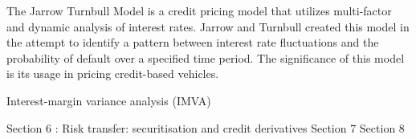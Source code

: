 The Jarrow Turnbull Model is a credit pricing model that utilizes multi-factor and dynamic analysis of interest rates.
Jarrow and Turnbull created this model in the attempt to identify a pattern between interest rate fluctuations and the probability of default over a specified time period. 
The significance of this model is its usage in pricing credit-based vehicles.






Interest-margin variance analysis (IMVA)


Section 6 : Risk transfer: securitisation and credit derivatives
Section 7
Section 8
 
 
